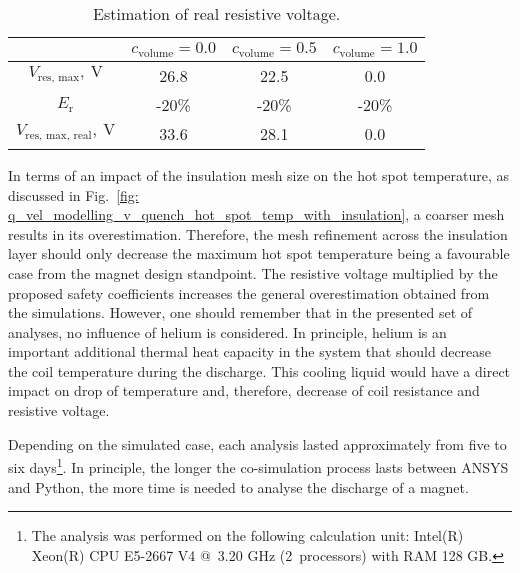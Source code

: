 \begin{table}[H]
    \caption{Estimation of real resistive voltage.} 
    \vspace{-1.em} 
    \fontsize{10}{10}
    \selectfont 
    \renewcommand{\arraystretch}{1.5}
    \begin{center}
        \begin{tabular}{ | c | c | c | c | }  
        \hline
         & $c_\text{volume}=0.0$ & $c_\text{volume}=0.5$ & $c_\text{volume}=1.0$ \\
        \hline
        $V_\text{res, max},~\text{V}$ & 26.8 & 22.5 & 0.0 \\
        $E_\text{r}$ & -20\% & -20\% & -20\% \\
        $V_\text{res, max, real},~\text{V}$ & 33.6 & 28.1 & 0.0 \\
        \hline 
        \end{tabular}
    \end{center}  
     \label{table: skew_quad_general_remarks_res_voltage} 
\end{table}

In terms of an impact of the insulation mesh size on the hot spot temperature, as discussed in Fig.~\ref{fig: q_vel_modelling_v_quench_hot_spot_temp_with_insulation}, a coarser mesh results in its overestimation. Therefore, the mesh refinement across the insulation layer should only decrease the maximum hot spot temperature being a favourable case from the magnet design standpoint. The resistive voltage multiplied by the proposed safety coefficients increases the general overestimation obtained from the simulations. However, one should remember that in the presented set of analyses, no influence of helium is considered. In principle, helium is an important additional thermal heat capacity in the system that should decrease the coil temperature during the discharge. This cooling liquid would have a direct impact on drop of temperature and, therefore, decrease of coil resistance and resistive voltage. 
 
Depending on the simulated case, each analysis lasted approximately from five to six days\footnote{The analysis was performed on the following calculation unit: Intel(R) Xeon(R) CPU E5-2667 V4 @~3.20 GHz (2~processors) with RAM 128 GB.}. In principle, the longer the co-simulation process lasts between ANSYS and Python, the more time is needed to analyse the discharge of a magnet.  